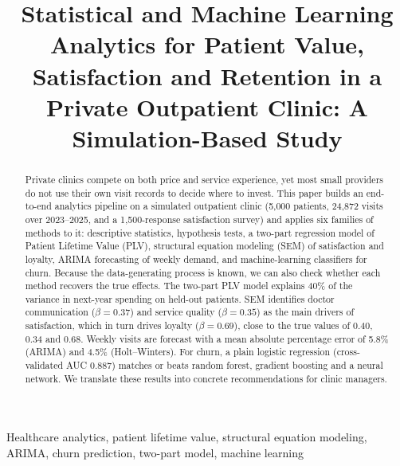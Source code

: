 \documentclass[conference]{IEEEtran}
\begin{document}
\title{Statistical and Machine Learning Analytics for Patient Value, Satisfaction and Retention in a Private Outpatient Clinic: A Simulation-Based Study}

\author{
}

\maketitle

\begin{abstract}
Private clinics compete on both price and service experience, yet most small providers do not use their own visit records to decide where to invest. This paper builds an end-to-end analytics pipeline on a simulated outpatient clinic (5{,}000 patients, 24{,}872 visits over 2023--2025, and a 1{,}500-response satisfaction survey) and applies six families of methods to it: descriptive statistics, hypothesis tests, a two-part regression model of Patient Lifetime Value (PLV), structural equation modeling (SEM) of satisfaction and loyalty, ARIMA forecasting of weekly demand, and machine-learning classifiers for churn. Because the data-generating process is known, we can also check whether each method recovers the true effects. The two-part PLV model explains 40\% of the variance in next-year spending on held-out patients. SEM identifies doctor communication ($\beta=0.37$) and service quality ($\beta=0.35$) as the main drivers of satisfaction, which in turn drives loyalty ($\beta=0.69$), close to the true values of 0.40, 0.34 and 0.68. Weekly visits are forecast with a mean absolute percentage error of 5.8\% (ARIMA) and 4.5\% (Holt--Winters). For churn, a plain logistic regression (cross-validated AUC 0.887) matches or beats random forest, gradient boosting and a neural network. We translate these results into concrete recommendations for clinic managers.
\end{abstract}

\begin{IEEEkeywords}
Healthcare analytics, patient lifetime value, structural equation modeling, ARIMA, churn prediction, two-part model, machine learning
\end{IEEEkeywords}
\end{document}

